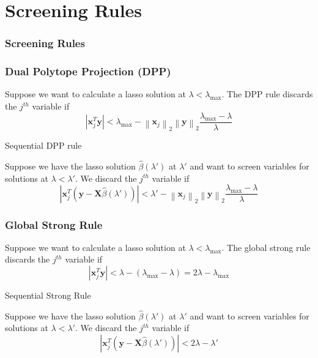 \documentclass{beamer}
\newcommand{\Norm}[1]{\left\lVert#1\right\rVert}
\newcommand{\norm}[1]{\left\lvert#1\right\rvert}
\begin{document}
\section{Screening Rules}

\begin{frame}
\frametitle{Screening Rules}


\end{frame}


\begin{frame}
\frametitle{Dual Polytope Projection (DPP)}
Suppose we want to calculate a lasso solution at $\lambda<\lambda_{\max}$. The DPP rule discards the $j^{th}$ variable if 
\[\norm{\mathbf{x}_j^T\mathbf{y}}<\lambda_{\max}-\Norm{\mathbf{x}_j}_2\Norm{\mathbf{y}}_2\frac{\lambda_{\max}-\lambda}{\lambda}\]

\vspace{5pt}
{\hspace{5pt}\Large Sequential DPP rule}
\vspace{15pt}

Suppose we have the lasso solution $\hat\beta(\lambda')$ at $\lambda'$ and want to screen variables for solutions at $\lambda<\lambda'$. We discard the $j^{th}$ variable if 
\[\norm{\mathbf{x}_j^T(\mathbf{y}-\mathbf{X}\hat{\beta}(\lambda'))}<\lambda'-\Norm{\mathbf{x}_j}_2\Norm{\mathbf{y}}_2\frac{\lambda_{\max}-\lambda}{\lambda}\]
\end{frame}

\begin{frame}
\frametitle{Global Strong Rule}
Suppose we want to calculate a lasso solution at $\lambda<\lambda_{\max}$. The global strong rule discards the $j^{th}$ variable if 
\[\norm{\mathbf{x}_j^T\mathbf{y}}<\lambda-(\lambda_{\max}-\lambda)=2\lambda-\lambda_{\max}\]

\vspace{5pt}
{\hspace{5pt}\Large Sequential Strong Rule}
\vspace{15pt}

Suppose we have the lasso solution $\hat\beta(\lambda')$ at $\lambda'$ and want to screen variables for solutions at $\lambda<\lambda'$. We discard the $j^{th}$ variable if 
\[\norm{\mathbf{x}_j^T(\mathbf{y}-\mathbf{X}\hat{\beta}(\lambda'))}<2\lambda-\lambda'\]
\end{frame}
\end{document}
